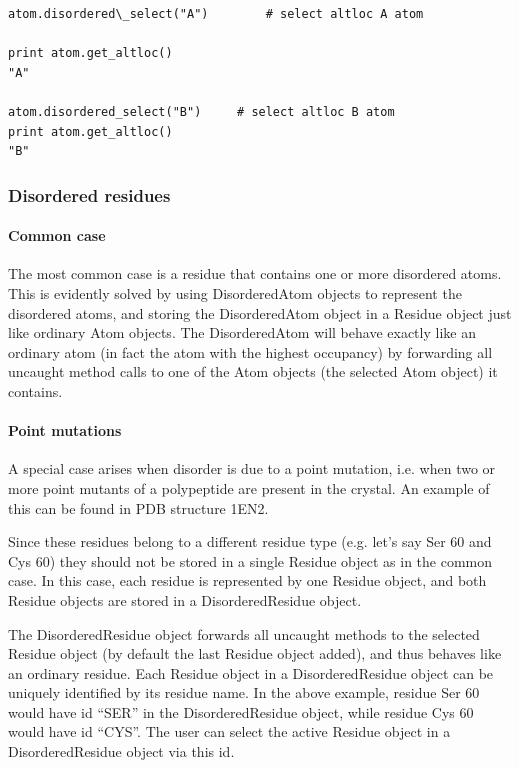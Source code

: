 \documentclass{report}
\begin{document}
\begin{verbatim}
atom.disordered\_select("A")		# select altloc A atom

print atom.get_altloc()
"A"

atom.disordered_select("B")	   	# select altloc B atom
print atom.get_altloc()
"B"
\end{verbatim}

\subsubsection{Disordered residues}

\paragraph{Common case}

The most common case is a residue that contains one or more disordered atoms.
This is evidently solved by using DisorderedAtom objects to represent the disordered
atoms, and storing the DisorderedAtom object in a Residue object just like ordinary
Atom objects. The DisorderedAtom will behave exactly like an ordinary atom (in
fact the atom with the highest occupancy) by forwarding all uncaught method
calls to one of the Atom objects (the selected Atom object) it contains. 


\paragraph{Point mutations\label{point mutations}}

A special case arises when disorder is due to a point mutation, i.e. when two
or more point mutants of a polypeptide are present in the crystal. An example
of this can be found in PDB structure 1EN2. 

Since these residues belong to a different residue type (e.g. let's say Ser
60 and Cys 60) they should not be stored in a single Residue object as in the
common case. In this case, each residue is represented by one Residue object,
and both Residue objects are stored in a DisorderedResidue object. 

The DisorderedResidue object forwards all uncaught methods to the selected Residue
object (by default the last Residue object added), and thus behaves like an
ordinary residue. Each Residue object in a DisorderedResidue object can be uniquely
identified by its residue name. In the above example, residue Ser 60 would have
id {}``SER{}'' in the DisorderedResidue object, while residue Cys 60 would
have id {}``CYS{}''. The user can select the active Residue object in a DisorderedResidue
object via this id.
\end{document}
